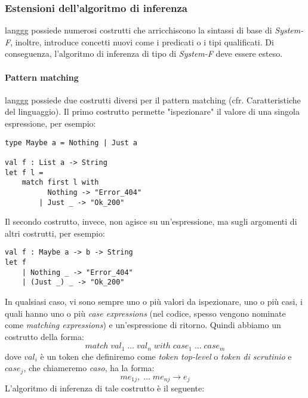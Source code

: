 \documentclass[10pt,a4paper]{article}
\begin{document}
\subsubsection{Estensioni dell'algoritmo di inferenza}
langgg possiede numerosi costrutti che arricchiscono la sintassi di base di \textit{System-F}, inoltre, introduce
concetti nuovi come i predicati o i tipi qualificati. Di conseguenza, l'algoritmo di inferenza di tipo di \textit{System-F}
deve essere esteso.

\paragraph{Pattern matching}
langgg possiede due costrutti diversi per il pattern matching (cfr. Caratteristiche del linguaggio). Il primo costrutto
permette "ispezionare" il valore di una singola espressione, per esempio:
\begin{lstlisting}
type Maybe a = Nothing | Just a

val f : List a -> String
let f l =
    match first l with
          Nothing -> "Error_404"
        | Just _ -> "Ok_200"
\end{lstlisting}
Il secondo costrutto, invece, non agisce su un'espressione, ma sugli argomenti di altri costrutti, per esempio:
\begin{lstlisting}
val f : Maybe a -> b -> String
let f
    | Nothing _ -> "Error_404"
    | (Just _) _ -> "Ok_200"
\end{lstlisting}
In qualsiasi caso, vi sono sempre uno o più valori da ispezionare, uno o più casi, i quali hanno uno o più \textit{case
expressions} (nel codice, spesso vengono nominate come \textit{matching expressions}) e un'espressione di ritorno.
Quindi abbiamo un costrutto della forma:
\[ match \; val_1 \; ... \; val_n \; with \; case_1 \; ... \; case_m \]
dove $ val_i $ è un token che definiremo come \textit{token top-level} o \textit{token di scrutinio} e
$ case_j $, che chiameremo \textit{caso}, ha la forma:
\[ me_{1j}, \; ... \; me_{nj} \rightarrow e_j \]
L'algoritmo di inferenza di tale costrutto è il seguente:
\end{document}
